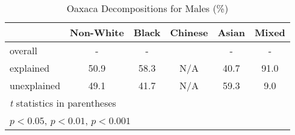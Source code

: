 \begin{table}[htbp]\centering
\caption{Oaxaca Decompositions for Males (\%)}
\begin{tabular}{l*{5}{c}}
\hline\hline
          &Non-White&    Black&  Chinese&    Asian&    Mixed\\
\hline
overall   &     -    &     -    &         &    -     &      -   \\
explained &     50.9\sym{***}&     58.3\sym{***}&    N/A&     40.7\sym{***}&     91.0\sym{*}\\
unexplained&     49.1\sym{***}&     41.7\sym{***}&    N/A&     59.3\sym{***}&      9.0\\
\hline\hline
\multicolumn{6}{l}{\footnotesize \textit{t} statistics in parentheses}\\
\multicolumn{6}{l}{\footnotesize \sym{*} \(p<0.05\), \sym{**} \(p<0.01\), \sym{***} \(p<0.001\)}\\
\end{tabular}
\label{tab:oaxaca_pct_male}
\end{table}
